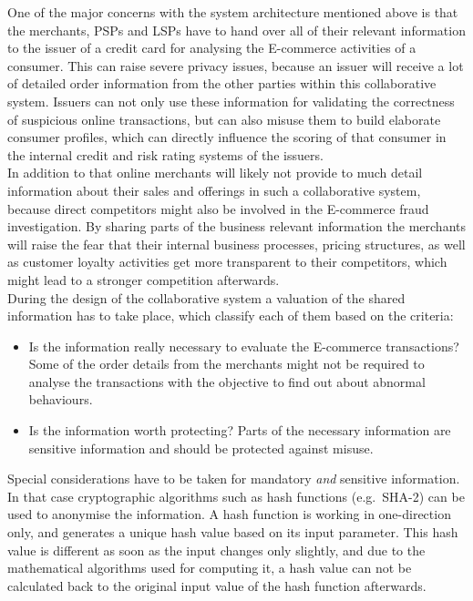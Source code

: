 One of the major concerns with the system architecture mentioned above is that the merchants, \gls{PSP}s and \gls{LSP}s have to hand over all of their relevant information to the issuer of a credit card for analysing the \gls{E-commerce} activities of a consumer. This can raise severe privacy issues, because an issuer will receive a lot of detailed order information from the other parties within this collaborative system. Issuers can not only use these information for validating the correctness of suspicious online transactions, but can also misuse them to build elaborate consumer profiles, which can directly influence the scoring of that consumer in the internal credit and risk rating systems of the issuers. \\

In addition to that online merchants will likely not provide to much detail information about their sales and offerings in such a collaborative system, because direct competitors might also be involved in the \gls{E-commerce} fraud investigation. By sharing parts of the business relevant information the merchants will raise the fear that their internal business processes, pricing structures, as well as customer loyalty activities get more transparent to their competitors, which might lead to a stronger competition afterwards. \\

During the design of the collaborative system a valuation of the shared information has to take place, which classify each of them based on the criteria: \@

\begin{itemize}
	\item Is the information really necessary to evaluate the \gls{E-commerce} transactions? Some of the order details from the merchants might not be required to analyse the transactions with the objective to find out about abnormal behaviours.
	\item Is the information worth protecting? Parts of the necessary information are sensitive information and should be protected against misuse.
\end{itemize}

Special considerations have to be taken for mandatory \emph{and} sensitive information. In that case cryptographic algorithms such as hash functions (e.g.\ \gls{SHA-2}) can be used to anonymise the information. A hash function is working in one-direction only, and generates a unique hash value based on its input parameter. This hash value is different as soon as the input changes only slightly, and due to the mathematical algorithms used for computing it, a hash value can not be calculated back to the original input value of the hash function afterwards. \\

